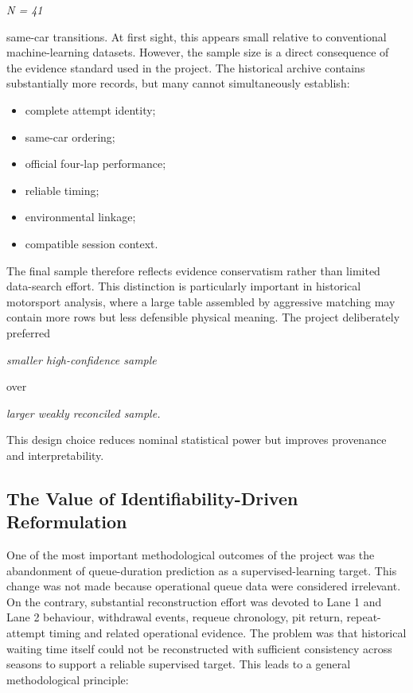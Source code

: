 \begin{center}\textit{N = 41}\end{center}

same-car transitions. At first sight, this appears small relative to conventional machine-learning datasets. However, the sample size is a direct consequence of the evidence standard used in the project. The historical archive contains substantially more records, but many cannot simultaneously establish:

\begin{itemize}
\item complete attempt identity;
\item same-car ordering;
\item official four-lap performance;
\item reliable timing;
\item environmental linkage;
\item compatible session context.
\end{itemize}

The final sample therefore reflects evidence conservatism rather than limited data-search effort. This distinction is particularly important in historical motorsport analysis, where a large table assembled by aggressive matching may contain more rows but less defensible physical meaning. The project deliberately preferred

\begin{center}\textit{smaller high-confidence sample}\end{center}

over

\begin{center}\textit{larger weakly reconciled sample.}\end{center}

This design choice reduces nominal statistical power but improves provenance and interpretability.

\subsection{The Value of Identifiability-Driven Reformulation}
One of the most important methodological outcomes of the project was the abandonment of queue-duration prediction as a supervised-learning target. This change was not made because operational queue data were considered irrelevant. On the contrary, substantial reconstruction effort was devoted to Lane 1 and Lane 2 behaviour, withdrawal events, requeue chronology, pit return, repeat-attempt timing and related operational evidence. The problem was that historical waiting time itself could not be reconstructed with sufficient consistency across seasons to support a reliable supervised target. This leads to a general methodological principle:


